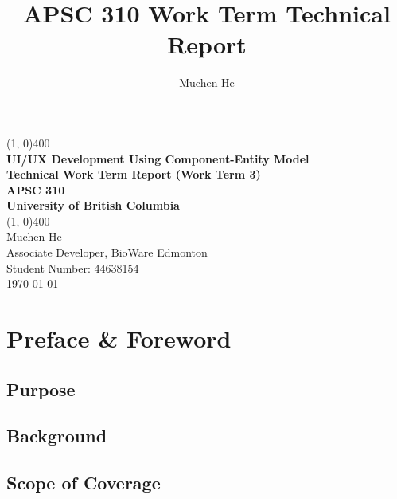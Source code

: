 \documentclass[10pt,letterpaper]{article}
\author{Muchen He}
\title{APSC 310 Work Term Technical Report}
\begin{document}
\begin{titlepage}
	\begin{center}
		\vspace*{3in}
		\line(1, 0){400}\\
		\Huge{\textbf{UI/UX Development Using Component-Entity Model}}\\[0.2cm]
		\large{\textbf{Technical Work Term Report (Work Term 3)}}\\[1cm]
		\Large{\textbf{APSC 310}}\\
		\textbf{University of British Columbia}\\
		\line(1, 0){400}\\
		\vfill
		\Large{Muchen He}\\
		\large{Associate Developer, BioWare Edmonton}\\
		Student Number: 44638154\\

		\today \\
	\end{center}
\end{titlepage}

\setcounter{secnumdepth}{3}
\tableofcontents
\thispagestyle{empty}
\clearpage



\section*{Preface \& Foreword}

\subsection*{Purpose}

\subsection*{Background}

\subsection*{Scope of Coverage}

\end{document}
